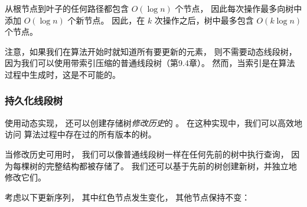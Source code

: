 从根节点到叶子的任何路径都包含
$O(\log n)$ 个节点，
因此每次操作最多向树中添加 $O(\log n)$ 个新节点。
因此，在 $k$ 次操作之后，树中最多包含
$O(k \log n)$ 个节点。

注意，如果我们在算法开始时就知道所有要更新的元素，
则不需要动态线段树，
因为我们可以使用带索引压缩的普通线段树（第9.4章）。
然而，当索引是在算法过程中生成时，这是不可能的。

\subsubsection{持久化线段树}


使用动态实现，
还可以创建存储树\emph{修改历史}的
。
在这种实现中，我们可以高效地访问
算法过程中存在过的所有版本的树。

当修改历史可用时，
我们可以像普通线段树一样在任何先前的树中执行查询，
因为每棵树的完整结构都被存储了。
我们还可以基于先前的树创建新树，并独立地修改它们。

考虑以下更新序列，
其中红色节点发生变化，
其他节点保持不变：

